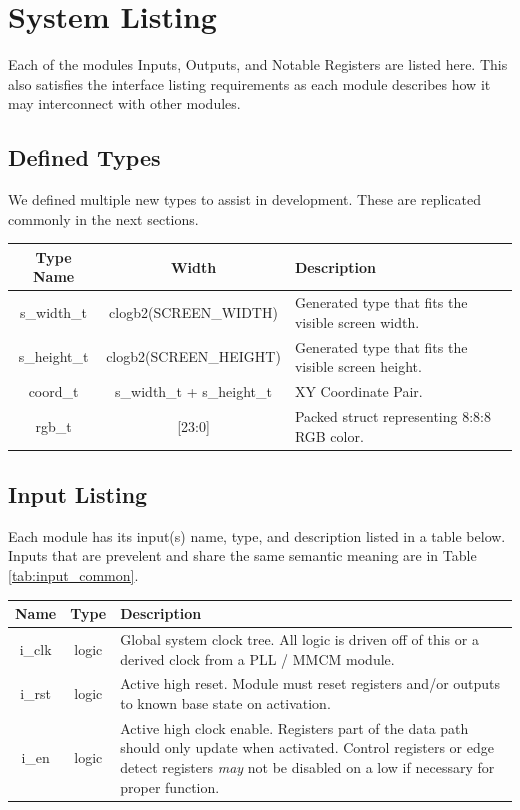 \documentclass[12pt]{article}
\begin{document}
\section{System Listing}

Each of the modules Inputs, Outputs, and Notable Registers are listed here. This
also satisfies the interface listing requirements as each module describes how
it may interconnect with other modules.

\subsection{Defined Types}

We defined multiple new types to assist in development. These are replicated
commonly in the next sections.

\begingroup
{}
\begin{tabularx}{\linewidth}{ ||c|c|X|| }
    \hline
    Type Name   & Width     & Description \\
    \hline
    s\_width\_t & clogb2(SCREEN\_WIDTH) & Generated type that fits the visible
    screen width. \\
    s\_height\_t & clogb2(SCREEN\_HEIGHT)  & Generated type that fits the visible
    screen height. \\
    coord\_t     &  s\_width\_t + s\_height\_t & XY Coordinate Pair. \\
    rgb\_t      & [23:0]    & Packed struct representing 8:8:8 RGB color. \\
    \hline
\end{tabularx}
\endgroup

\newpage
\subsection{Input Listing}
Each module has its input(s) name, type, and description listed in a table
below. Inputs that are prevelent and share the same semantic meaning are in Table
\ref{tab:input_common}.

\begingroup
{}
\label{tab:input_common}
\begin{tabularx}{\linewidth}{ ||c|c|X|| }
    \hline
    Name & Type & Description \\
    \hline
    i\_clk & logic & Global system clock tree. All logic is driven off of this
    or a derived clock from a PLL / MMCM module. \\
    i\_rst & logic & Active high reset. Module must reset registers and/or
    outputs to known base state on activation. \\
    i\_en   & logic & Active high clock enable. Registers part of the data path
    should only update when activated. Control registers or edge detect
    registers \emph{may} not be disabled on a low if necessary for proper function. \\
    \hline
\end{tabularx}
\endgroup
\end{document}
